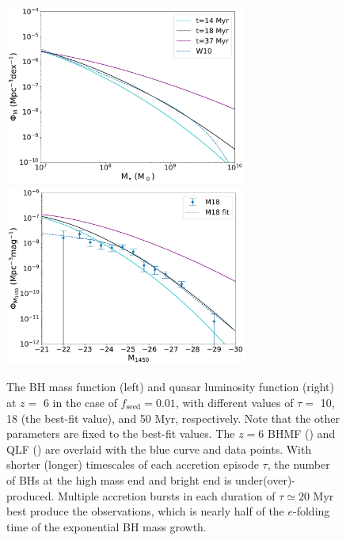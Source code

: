 \documentclass[twocolumn, twocolappendix]{aastex63}
\newcommand{\tlife}{\tau}
\newcommand{\fseed}{f_\mathrm{seed}}
\begin{document}
\begin{CJK*}{UTF8}{gbsn}
\begin{figure}
\centering
\includegraphics[width=80mm]{f2MFtau.pdf}
\includegraphics[width=80mm]{f2LFtau.pdf}
\caption{
The BH mass function (left) and quasar luminosity function (right) at $z=$ 6 in the case of $\fseed=0.01$, 
with different values of $\tlife=$ 10, 18 (the best-fit value), and 50 Myr, respectively.
Note that the other parameters are fixed to the best-fit values. 
The $z=6$ BHMF () and QLF () 
are overlaid with the blue curve and data points.
With shorter (longer) timescales of each accretion episode $\tlife$, the number of BHs at the high mass end and bright end is under(over)-produced.
Multiple accretion bursts in each duration of $\tau \simeq 20$ Myr best produce the observations,
which is nearly half of the $e$-folding time of the exponential BH mass growth.
}
\label{fig:tau}
\end{figure}

\vspace{2mm}

\end{CJK*}
\end{document}
